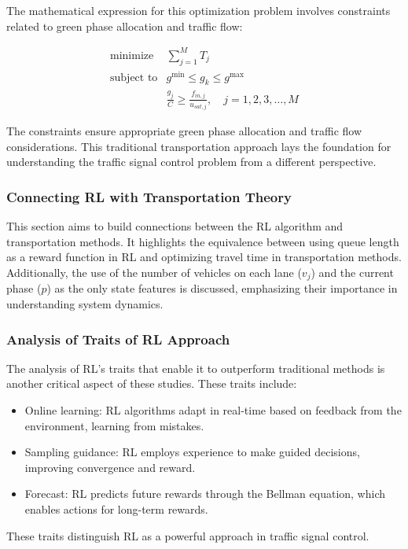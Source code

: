 The mathematical expression for this optimization problem involves constraints related to green phase allocation and traffic flow:

\[
\begin{array}{ll}
\text{minimize} & \sum_{j=1}^M T_j \\
\text{subject to} & g^{\text{min}} \leq g_k \leq g^{\max} \\
& \frac{g_j}{C} \geq \frac{f_{in, j}}{u_{sat, j}}, \quad j=1,2,3, \ldots, M
\end{array}
\]

The constraints ensure appropriate green phase allocation and traffic flow considerations. This traditional transportation approach lays the foundation for understanding the traffic signal control problem from a different perspective.

\subsubsection{Connecting RL with Transportation Theory}

This section aims to build connections between the RL algorithm and transportation methods. It highlights the equivalence between using queue length as a reward function in RL and optimizing travel time in transportation methods. Additionally, the use of the number of vehicles on each lane ($v_j$) and the current phase ($p$) as the only state features is discussed, emphasizing their importance in understanding system dynamics.

\subsubsection{Analysis of Traits of RL Approach}

The analysis of RL's traits that enable it to outperform traditional methods is another critical aspect of these studies. These traits include:

\begin{itemize}
    \item Online learning: RL algorithms adapt in real-time based on feedback from the environment, learning from mistakes.
    \item Sampling guidance: RL employs experience to make guided decisions, improving convergence and reward.
    \item Forecast: RL predicts future rewards through the Bellman equation, which enables actions for long-term rewards.
\end{itemize}

These traits distinguish RL as a powerful approach in traffic signal control.
